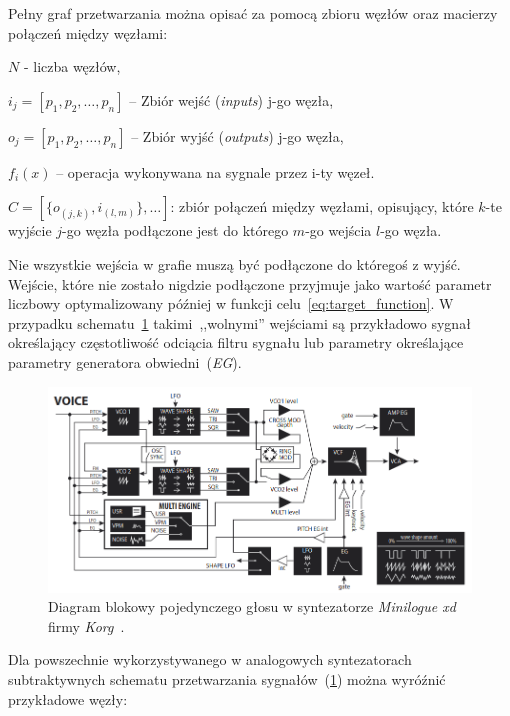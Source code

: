 Pełny graf przetwarzania można opisać za pomocą zbioru węzłów oraz
macierzy połączeń między węzłami:

$N$ - liczba węzłów,

$i_{j} = [ p_1, p_2, \ldots, p_n ]$ -- Zbiór wejść (\textit{inputs}) j-go węzła,

$o_{j} = [ p_1, p_2, \ldots, p_n ]$ -- Zbiór wyjść (\textit{outputs}) j-go węzła,

$f_i(x)$ -- operacja wykonywana na sygnale przez i-ty węzeł. %

$C = [ \{ o_{(j, k)}, i_{(l, m)} \}, \ldots ] $: zbiór połączeń między węzłami, opisujący, które 
$k$-te wyjście $j$-go węzła podłączone jest do którego $m$-go wejścia $l$-go węzła.

Nie wszystkie wejścia w grafie muszą być podłączone do któregoś z wyjść.
Wejście, które nie zostało nigdzie podłączone przyjmuje jako wartość parametr 
liczbowy optymalizowany później w funkcji celu~\ref{eq:target_function}.
W przypadku schematu~\ref{fig:minilogue_diagram} takimi~,,wolnymi'' wejściami są przykładowo
sygnał określający częstotliwość odciącia filtru sygnału lub parametry określające parametry
generatora obwiedni~(\textit{EG}).


\begin{figure}[H]\label{fig:minilogue_diagram}
    \centering
    \includegraphics[width=0.8\linewidth]{rys01/minilogue_voice_block_diagram.png}
    \caption{
      Diagram blokowy pojedynczego głosu w syntezatorze 
      \textit{Minilogue xd} firmy \textit{Korg}~\cite{minilogue_diagram}.
    }
\end{figure}

Dla powszechnie wykorzystywanego w analogowych syntezatorach subtraktywnych 
schematu przetwarzania sygnałów~(\ref{fig:minilogue_diagram}) można wyróźnić przykładowe węzły: \\

